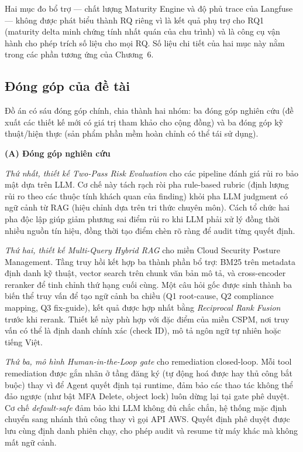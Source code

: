 Hai mục đo bổ trợ — chất lượng Maturity Engine và độ phủ trace của Langfuse — không được phát biểu thành RQ riêng vì là kết quả phụ trợ cho RQ1 (maturity delta minh chứng tính nhất quán của chu trình) và là công cụ vận hành cho phép trích số liệu cho mọi RQ. Số liệu chi tiết của hai mục này nằm trong các phần tương ứng của Chương~6.

\subsection{Đóng góp của đề tài}
\label{subsec:contributions-recap}

Đồ án có sáu đóng góp chính, chia thành hai nhóm: ba đóng góp nghiên cứu (đề xuất các thiết kế mới có giá trị tham khảo cho cộng đồng) và ba đóng góp kỹ thuật/hiện thực (sản phẩm phần mềm hoàn chỉnh có thể tái sử dụng).

\medskip
\noindent\textbf{(A) Đóng góp nghiên cứu}
\medskip

\textit{Thứ nhất, thiết kế Two-Pass Risk Evaluation} cho các pipeline đánh giá rủi ro bảo mật dựa trên LLM. Cơ chế này tách rạch ròi pha rule-based rubric (định lượng rủi ro theo các thuộc tính khách quan của finding) khỏi pha LLM judgment có ngữ cảnh từ RAG (hiệu chỉnh dựa trên tri thức chuyên môn). Cách tổ chức hai pha độc lập giúp giảm phương sai điểm rủi ro khi LLM phải xử lý đồng thời nhiều nguồn tín hiệu, đồng thời tạo điểm chèn rõ ràng để audit từng quyết định.

\textit{Thứ hai, thiết kế Multi-Query Hybrid RAG} cho miền Cloud Security Posture Management. Tầng truy hồi kết hợp ba thành phần bổ trợ: BM25 trên metadata định danh kỹ thuật, vector search trên chunk văn bản mô tả, và cross-encoder reranker để tinh chỉnh thứ hạng cuối cùng. Một câu hỏi gốc được sinh thành ba biến thể truy vấn để tạo ngữ cảnh ba chiều (Q1 root-cause, Q2 compliance mapping, Q3 fix-guide), kết quả được hợp nhất bằng \textit{Reciprocal Rank Fusion} trước khi rerank. Thiết kế này phù hợp với đặc điểm của miền CSPM, nơi truy vấn có thể là định danh chính xác (check ID), mô tả ngôn ngữ tự nhiên hoặc tiếng Việt.

\textit{Thứ ba, mô hình Human-in-the-Loop gate} cho remediation closed-loop. Mỗi tool remediation được gắn nhãn ở tầng đăng ký (tự động hoá được hay thủ công bắt buộc) thay vì để Agent quyết định tại runtime, đảm bảo các thao tác không thể đảo ngược (như bật MFA Delete, object lock) luôn dừng lại tại gate phê duyệt. Cơ chế \textit{default-safe} đảm bảo khi LLM không đủ chắc chắn, hệ thống mặc định chuyển sang nhánh thủ công thay vì gọi API AWS. Quyết định phê duyệt được lưu cùng định danh phiên chạy, cho phép audit và resume từ máy khác mà không mất ngữ cảnh.

